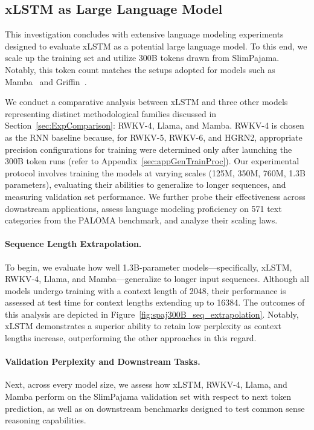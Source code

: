 \subsection{xLSTM as Large Language Model}
\label{sec:ExpLanguage}

This investigation concludes with extensive language modeling experiments designed to evaluate xLSTM as a potential large language model. To this end, we scale up the training set and utilize 300B tokens drawn from SlimPajama. Notably, this token count matches the setups adopted for models such as Mamba~\citep{Gu:24arxiv} and Griffin~\citep{De:24arxiv}.

We conduct a comparative analysis between xLSTM and three other models representing distinct methodological families discussed in Section~\ref{sec:ExpComparison}: RWKV-4, Llama, and Mamba. RWKV-4 is chosen as the RNN baseline because, for RWKV-5, RWKV-6, and HGRN2, appropriate precision configurations for training were determined only after launching the 300B token runs (refer to Appendix~\ref{sec:appGenTrainProc}). Our experimental protocol involves training the models at varying scales (125M, 350M, 760M, 1.3B parameters), evaluating their abilities to generalize to longer sequences, and measuring validation set performance. We further probe their effectiveness across downstream applications, assess language modeling proficiency on 571 text categories from the PALOMA benchmark, and analyze their scaling laws.

\paragraph{Sequence Length Extrapolation.}
\label{sec:spaj300B_ctx_extrapolation}
To begin, we evaluate how well 1.3B-parameter models—specifically, xLSTM, RWKV-4, Llama, and Mamba—generalize to longer input sequences. Although all models undergo training with a context length of 2048, their performance is assessed at test time for context lengths extending up to 16384. The outcomes of this analysis are depicted in Figure~\ref{fig:spaj300B_seq_extrapolation}. Notably, xLSTM demonstrates a superior ability to retain low perplexity as context lengths increase, outperforming the other approaches in this regard.

\paragraph{Validation Perplexity and Downstream Tasks.}
\label{sec:spaj_downstream_eval}
Next, across every model size, we assess how xLSTM, RWKV-4, Llama, and Mamba perform on the SlimPajama validation set with respect to next token prediction, as well as on downstream benchmarks designed to test common sense reasoning capabilities.

